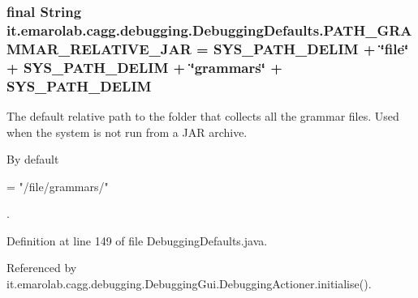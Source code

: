 \hypertarget{classit_1_1emarolab_1_1cagg_1_1debugging_1_1DebuggingDefaults_ae6ad1a59b49a5036e0d030c6bb336062}{
\subsubsection[{P\-A\-T\-H\-\_\-\-G\-R\-A\-M\-M\-A\-R\-\_\-\-R\-E\-L\-A\-T\-I\-V\-E\-\_\-\-J\-A\-R}]{\setlength{\rightskip}{0pt plus 5cm}final String it.\-emarolab.\-cagg.\-debugging.\-Debugging\-Defaults.\-P\-A\-T\-H\-\_\-\-G\-R\-A\-M\-M\-A\-R\-\_\-\-R\-E\-L\-A\-T\-I\-V\-E\-\_\-\-J\-A\-R = {\bf S\-Y\-S\-\_\-\-P\-A\-T\-H\-\_\-\-D\-E\-L\-I\-M} + \char`\"{}file\char`\"{} + S\-Y\-S\-\_\-\-P\-A\-T\-H\-\_\-\-D\-E\-L\-I\-M + \char`\"{}grammars\char`\"{} + S\-Y\-S\-\_\-\-P\-A\-T\-H\-\_\-\-D\-E\-L\-I\-M\hspace{0.3cm}{\ttfamily [static]}}}\label{classit_1_1emarolab_1_1cagg_1_1debugging_1_1DebuggingDefaults_ae6ad1a59b49a5036e0d030c6bb336062}
The default relative path to the folder that collects all the grammar files. Used when the system is not run from a J\-A\-R archive.\par
 By default
\begin{DoxyCode}
= \textcolor{stringliteral}{"/file/grammars/"} 
\end{DoxyCode}
 . 

Definition at line 149 of file Debugging\-Defaults.\-java.



Referenced by it.\-emarolab.\-cagg.\-debugging.\-Debugging\-Gui.\-Debugging\-Actioner.\-initialise().

